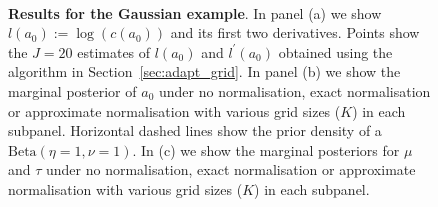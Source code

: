 \documentclass[a4paper, notitlepage, 11pt]{article}
\begin{document}
\begin{figure}[!ht]
\hfill
{}
\hfill
{}\\
\hfill
{}
\hfill
\caption{\textbf{Results for the Gaussian example}.
In panel (a) we show $l(a_0) := \log(c(a_0))$ and its first two derivatives.
Points show the $J = 20$ estimates of $l(a_0)$ and $l^\prime(a_0)$ obtained using the algorithm in Section~\ref{sec:adapt_grid}.
In panel (b)  we show the marginal posterior of $a_0$ under no normalisation, exact normalisation or approximate normalisation with various grid sizes ($K$) in each subpanel.
Horizontal dashed lines show the prior density of a $\text{Beta}(\eta = 1, \nu = 1)$.
In (c) we show the marginal posteriors for $\mu$ and $\tau$ under no normalisation, exact normalisation or approximate normalisation with various grid sizes ($K$) in each subpanel.
}
\label{fig:gaussian_results}
\end{figure}
\end{document}
